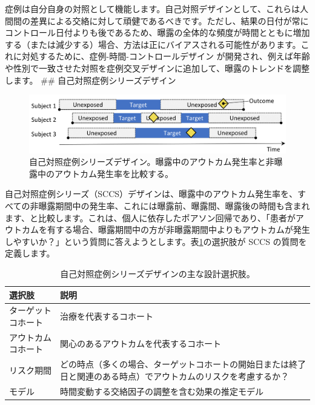 \documentclass[
  11pt]{book}
\theoremstyle{definition}
\theoremstyle{definition}
\theoremstyle{definition}
\theoremstyle{definition}
\theoremstyle{remark}
\begin{document}
症例は自分自身の対照として機能します。自己対照デザインとして、これらは人間間の差異による交絡に対して頑健であるべきです。ただし、結果の日付が常にコントロール日付よりも後であるため、曝露の全体的な頻度が時間とともに増加する（または減少する）場合、方法は正にバイアスされる可能性があります。これに対処するために、症例-時間-コントロールデザイン \citep{suissa_1995} が開発され、例えば年齢や性別で一致させた対照を症例交叉デザインに追加して、曝露のトレンドを調整します。
\#\# 自己対照症例シリーズデザイン


\begin{figure}[h]

{\centering \includegraphics[width=0.9\linewidth]{images/PopulationLevelEstimation/selfControlledCaseSeries} 

}

\caption{自己対照症例シリーズデザイン。曝露中のアウトカム発生率と非曝露中のアウトカム発生率を比較する。}\label{fig:selfControlledCaseSeries}
\end{figure}

自己対照症例シリーズ（SCCS）デザイン\citep{farrington_1995, whitaker_2006}は、曝露中のアウトカム発生率を、すべての非曝露期間中の発生率、これには曝露前、曝露間、曝露後の時間も含まれます、と比較します。これは、個人に依存したポアソン回帰であり、「患者がアウトカムを有する場合、曝露期間中の方が非曝露期間中よりもアウトカムが発生しやすいか？」という質問に答えようとします。表\ref{tab:sccsChoices}の選択肢が SCCS の質問を定義します。  

\begin{table}
\centering
\caption{\label{tab:sccsChoices}自己対照症例シリーズデザインの主な設計選択肢。}
\centering
\begin{tabular}[t]{l>{\raggedright\arraybackslash}p{9cm}}
\toprule
選択肢 & 説明\\
\midrule
ターゲットコホート & 治療を代表するコホート\\
アウトカムコホート & 関心のあるアウトカムを代表するコホート\\
リスク期間 & どの時点（多くの場合、ターゲットコホートの開始日または終了日と関連のある時点）でアウトカムのリスクを考慮するか？\\
モデル & 時間変動する交絡因子の調整を含む効果の推定モデル\\
\bottomrule
\end{tabular}
\end{table}
\end{document}
